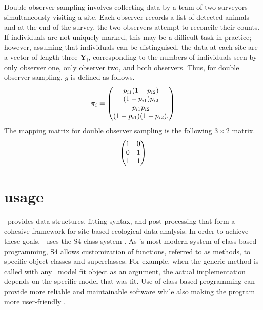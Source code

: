 \documentclass[article,shortnames]{jss}
\newcommand{\um}{\pkg{unmarked}}
\newcommand{\rlang}{\proglang{R}}
\begin{document}
Double observer sampling involves collecting data by a team of two surveyors
simultaneously visiting a site.  Each observer records a list of detected 
animals and at the end of the survey, the two observers attempt to reconcile
their counts.  If individuals are not uniquely marked, this may be a difficult 
task in practice; however, assuming that individuals can be distinguised, the 
data at each site are a vector of length three $\mathbf Y_i$,
corresponding to the numbers of individuals seen by only observer one,
only observer two, and both observers.  Thus, for double observer sampling, 
$g$ is
defined as follows.
\begin{equation}
  \mathbf \pi_i =
  \begin{pmatrix}
    p_{i1}(1-p_{i2}) \\
    (1-p_{i1})p_{i2} \\
    p_{i1}p_{i2} \\
    (1-p_{i1})(1-p_{i2}).
  \end{pmatrix} \notag
\end{equation}
The  mapping matrix for double observer sampling is the
following $3 \times 2$ matrix.
\begin{equation}
  \begin{pmatrix}
    1 & 0 \\
    0 & 1 \\
    1 & 1 
  \end{pmatrix} \notag
\end{equation}


\section[unmarked usage]{ usage}
\label{sec:unmarked-usage}

\um\ provides data structures, fitting syntax, and post-processing that form a
cohesive framework for site-based ecological data analysis.  In order
to achieve these goals, \um\ uses the S4 class system
\citep{Chambers2008}. As \rlang's most modern system of class-based
programming, S4 allows customization of functions, referred to as
methods, to specific object classes and superclasses. For example,
when the generic  method is called with any \um\ model
fit object as an argument, the actual  implementation
depends on the specific model that was fit.  Use of class-based
programming can provide more reliable and maintainable software while
also making the program more user-friendly \citep{Chambers2008}.
\end{document}
